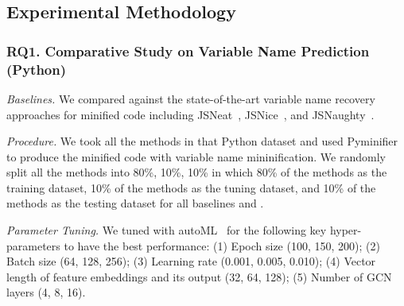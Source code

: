 \subsection{Experimental Methodology}
\label{empirical-method}

\subsubsection{RQ1. Comparative Study on Variable Name Prediction (Python)\\}
{\em Baselines.} We compared {\tool} against the state-of-the-art
variable name recovery approaches for minified code including
JSNeat~\cite{icse19}, JSNice~\cite{JSNice2015}, and
JSNaughty~\cite{JSNaughty2017}.

\textit{Procedure.} We took all the methods in that Python dataset
and used Pyminifier to produce the minified code with variable name
mininification. We randomly split all the methods into 80\%, 10\%,
10\% in which 80\% of the methods as the training dataset, 10\% of the
methods as the tuning dataset, and 10\% of the methods as the testing
dataset for all baselines and {\tool}.


{\em Parameter Tuning.} We tuned {\tool} with autoML~\cite{NNI} for
the following key hyper-parameters to have the best performance: (1)
Epoch size (100, 150, 200); (2) Batch size (64, 128, 256); (3)
Learning rate (0.001, 0.005, 0.010); (4) Vector length of feature
embeddings and its output (32, 64, 128); (5) Number of GCN layers (4,
8, 16).

